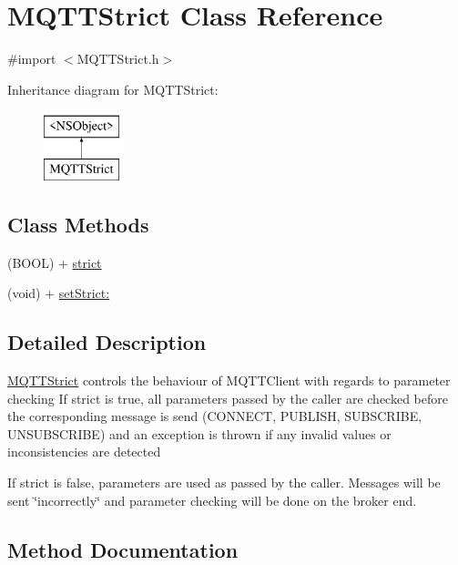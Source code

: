 \hypertarget{interface_m_q_t_t_strict}{}\section{M\+Q\+T\+T\+Strict Class Reference}
\label{interface_m_q_t_t_strict}


{\ttfamily \#import $<$M\+Q\+T\+T\+Strict.\+h$>$}

Inheritance diagram for M\+Q\+T\+T\+Strict\+:\begin{figure}[H]
\begin{center}
\leavevmode
\includegraphics[height=2.000000cm]{interface_m_q_t_t_strict}
\end{center}
\end{figure}
\subsection*{Class Methods}
\begin{DoxyCompactItemize}
\item 
(B\+O\+OL) + \hyperlink{interface_m_q_t_t_strict_ae2662f2299f2e9936fee25522cd44cf3}{strict}
\item 
(void) + \hyperlink{interface_m_q_t_t_strict_aa6c70443d4ab02e58dfe2c184b021039}{set\+Strict\+:}
\end{DoxyCompactItemize}


\subsection{Detailed Description}
\hyperlink{interface_m_q_t_t_strict}{M\+Q\+T\+T\+Strict} controls the behaviour of M\+Q\+T\+T\+Client with regards to parameter checking If strict is true, all parameters passed by the caller are checked before the corresponding message is send (C\+O\+N\+N\+E\+CT, P\+U\+B\+L\+I\+SH, S\+U\+B\+S\+C\+R\+I\+BE, U\+N\+S\+U\+B\+S\+C\+R\+I\+BE) and an exception is thrown if any invalid values or inconsistencies are detected

If strict is false, parameters are used as passed by the caller. Messages will be sent \char`\"{}incorrectly\char`\"{} and parameter checking will be done on the broker end. 

\subsection{Method Documentation}
\mbox{\label{interface_m_q_t_t_strict_aa6c70443d4ab02e58dfe2c184b021039}} 
